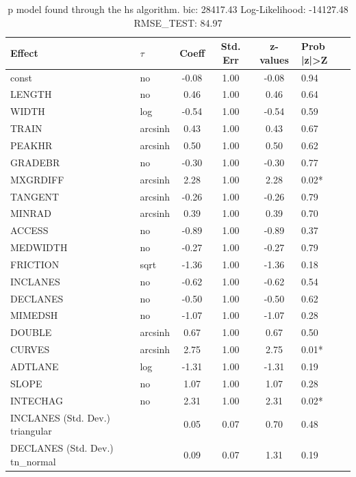 \begin{table}
	\caption{p model found through the hs algorithm. bic: 28417.43 Log-Likelihood: -14127.48 RMSE_TEST: 84.97}
	\begin{center}
		\begin{tabular}{|l|l|c|c|c|l|}
			\hline
			Effect & $\tau$ & Coeff & Std. Err & z-values & Prob |z|>Z \\
			\hline
			const & no & -0.08 & 1.00 & -0.08 & 0.94 \\
			\hline
			LENGTH & no & 0.46 & 1.00 & 0.46 & 0.64 \\
			\hline
			WIDTH & log & -0.54 & 1.00 & -0.54 & 0.59 \\
			\hline
			TRAIN & arcsinh & 0.43 & 1.00 & 0.43 & 0.67 \\
			\hline
			PEAKHR & arcsinh & 0.50 & 1.00 & 0.50 & 0.62 \\
			\hline
			GRADEBR & no & -0.30 & 1.00 & -0.30 & 0.77 \\
			\hline
			MXGRDIFF & arcsinh & 2.28 & 1.00 & 2.28 & 0.02* \\
			\hline
			TANGENT & arcsinh & -0.26 & 1.00 & -0.26 & 0.79 \\
			\hline
			MINRAD & arcsinh & 0.39 & 1.00 & 0.39 & 0.70 \\
			\hline
			ACCESS & no & -0.89 & 1.00 & -0.89 & 0.37 \\
			\hline
			MEDWIDTH & no & -0.27 & 1.00 & -0.27 & 0.79 \\
			\hline
			FRICTION & sqrt & -1.36 & 1.00 & -1.36 & 0.18 \\
			\hline
			INCLANES & no & -0.62 & 1.00 & -0.62 & 0.54 \\
			\hline
			DECLANES & no & -0.50 & 1.00 & -0.50 & 0.62 \\
			\hline
			MIMEDSH & no & -1.07 & 1.00 & -1.07 & 0.28 \\
			\hline
			DOUBLE & arcsinh & 0.67 & 1.00 & 0.67 & 0.50 \\
			\hline
			CURVES & arcsinh & 2.75 & 1.00 & 2.75 & 0.01* \\
			\hline
			ADTLANE & log & -1.31 & 1.00 & -1.31 & 0.19 \\
			\hline
			SLOPE & no & 1.07 & 1.00 & 1.07 & 0.28 \\
			\hline
			INTECHAG & no & 2.31 & 1.00 & 2.31 & 0.02* \\
			\hline
			INCLANES (Std. Dev.) triangular &  & 0.05 & 0.07 & 0.70 & 0.48 \\
			\hline
			DECLANES (Std. Dev.) tn_normal &  & 0.09 & 0.07 & 1.31 & 0.19 \\

\end{tabular}
\end{center}
\end{table}
